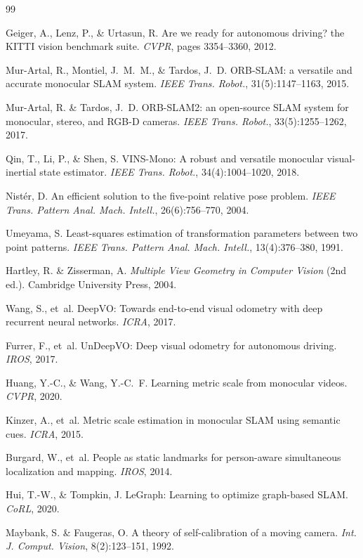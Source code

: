 \documentclass[12pt,a4paper]{article}
\begin{document}
\begin{thebibliography}{99}

Geiger, A., Lenz, P., \& Urtasun, R.
\newblock Are we ready for autonomous driving? the KITTI vision benchmark suite.
\newblock \emph{CVPR}, pages 3354--3360, 2012.

Mur-Artal, R., Montiel, J.~M.~M., \& Tardos, J.~D.
\newblock ORB-SLAM: a versatile and accurate monocular SLAM system.
\newblock \emph{IEEE Trans. Robot.}, 31(5):1147--1163, 2015.

Mur-Artal, R. \& Tardos, J.~D.
\newBlock ORB-SLAM2: an open-source SLAM system for monocular, stereo, and RGB-D cameras.
\newblock \emph{IEEE Trans. Robot.}, 33(5):1255--1262, 2017.

Qin, T., Li, P., \& Shen, S.
\newblock VINS-Mono: A robust and versatile monocular visual-inertial state estimator.
\newblock \emph{IEEE Trans. Robot.}, 34(4):1004--1020, 2018.

Nist\'er, D.
\newblock An efficient solution to the five-point relative pose problem.
\newblock \emph{IEEE Trans. Pattern Anal. Mach. Intell.}, 26(6):756--770, 2004.

Umeyama, S.
\newblock Least-squares estimation of transformation parameters between two point patterns.
\newblock \emph{IEEE Trans. Pattern Anal. Mach. Intell.}, 13(4):376--380, 1991.

Hartley, R. \& Zisserman, A.
\newblock \emph{Multiple View Geometry in Computer Vision} (2nd ed.).
\newblock Cambridge University Press, 2004.

Wang, S., et~al.
\newblock DeepVO: Towards end-to-end visual odometry with deep recurrent neural networks.
\newblock \emph{ICRA}, 2017.

Furrer, F., et~al.
\newblock UnDeepVO: Deep visual odometry for autonomous driving.
\newblock \emph{IROS}, 2017.

Huang, Y.-C., \& Wang, Y.-C.~F.
\newblock Learning metric scale from monocular videos.
\newblock \emph{CVPR}, 2020.

Kinzer, A., et~al.
\newblock Metric scale estimation in monocular SLAM using semantic cues.
\newblock \emph{ICRA}, 2015.

Burgard, W., et~al.
\newblock People as static landmarks for person-aware simultaneous localization and mapping.
\newblock \emph{IROS}, 2014.

Hui, T.-W., \& Tompkin, J.
\newblock LeGraph: Learning to optimize graph-based SLAM.
\newblock \emph{CoRL}, 2020.

Maybank, S. \& Faugeras, O.
\newblock A theory of self-calibration of a moving camera.
\newblock \emph{Int. J. Comput. Vision}, 8(2):123--151, 1992.

\end{thebibliography}
\end{document}
